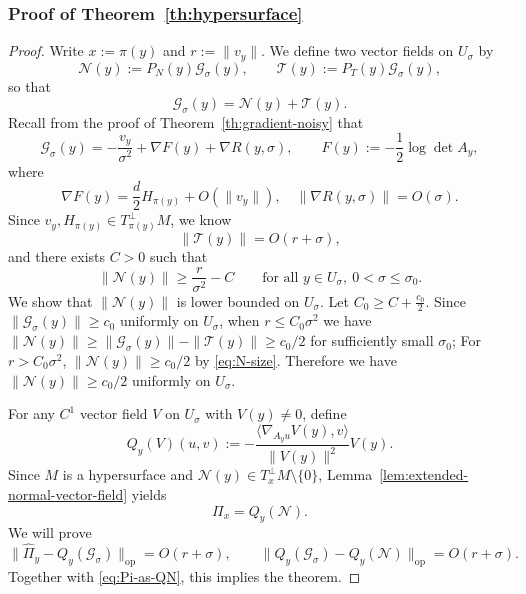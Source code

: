 \documentclass[11pt]{article}
\theoremstyle{plain}
\theoremstyle{definition}
\begin{document}
\subsubsection{Proof of Theorem~\ref{th:hypersurface}}\label{sec:pf-hypersurface}
\begin{proof}
Write $x:=\pi(y)$ and $r:=\|v_y\|$. We define two vector fields on $U_\sigma$ by
\[
\mathcal N(y):=P_N(y)\mathcal G_\sigma(y),
\qquad
\mathcal T(y):=P_T(y)\mathcal G_\sigma(y),
\]
so that
\[
\mathcal G_\sigma(y)=\mathcal N(y)+\mathcal T(y).
\]
Recall from the proof of Theorem~\ref{th:gradient-noisy} that \[
\mathcal G_\sigma(y)
=
-\frac{v_y}{\sigma^2}+\nabla F(y)+\nabla R(y,\sigma),
\qquad
F(y):=-\frac12\log\det A_y,
\]
where 
\[
\nabla F(y)=\frac d2 H_{\pi(y)}+O(\|v_y\|), \quad \|\nabla R(y,\sigma)\|=O(\sigma).
\]
Since $v_y, H_{\pi(y)}\in T_{\pi(y)}^\perp M$, we know
\begin{equation}\label{eq:T-size}
\|\mathcal T(y)\|=O(r+\sigma),
\end{equation}
and there exists $C>0$ such that
\begin{equation}\label{eq:N-size}
\|\mathcal N(y)\|\ge \frac{r}{\sigma^2} -C \qquad
\text{for all }y\in U_\sigma,\ 0<\sigma\le\sigma_0.
\end{equation}
We show that $\|\mathcal N(y)\|$ is lower bounded on $U_\sigma$. Let $C_0 \ge C + \frac{c_0}{2}$.
Since $\|\mathcal G_\sigma(y)\|\ge c_0$ uniformly on $U_\sigma$, when $r\le C_0\sigma^2$ we have $\|\mathcal N(y)\| \ge \|\mathcal G_\sigma(y)\| - \|\mathcal T(y)\| \ge c_0/2$ for sufficiently small $\sigma_0$; For $r>C_0\sigma^2$, $\|\mathcal N(y)\|\ge c_0/2$ by \eqref{eq:N-size}. Therefore we have $\|\mathcal N(y)\|\ge c_0/2$ uniformly on $U_\sigma$. 

For any $C^1$ vector field $V$ on $U_\sigma$ with $V(y)\neq 0$, define
\[
Q_y(V)(u,v)
:=
-\frac{\langle \nabla_{A_yu}V(y),v\rangle}{\|V(y)\|^2}V(y).
\]
Since $M$ is a hypersurface and $\mathcal N(y)\in T_x^\perp M\setminus\{0\}$, Lemma~\ref{lem:extended-normal-vector-field} yields
\begin{equation}\label{eq:Pi-as-QN}
\Pi_x=Q_y(\mathcal N).
\end{equation}
We will prove
\begin{equation}\label{eq:hypersurface-split}
\|\widehat\Pi_y-Q_y(\mathcal G_\sigma)\|_{\mathrm{op}}=O(r+\sigma),
\qquad
\|Q_y(\mathcal G_\sigma)-Q_y(\mathcal N)\|_{\mathrm{op}}=O(r+\sigma).
\end{equation}
Together with \eqref{eq:Pi-as-QN}, this implies the theorem.


\end{proof}
\end{document}
